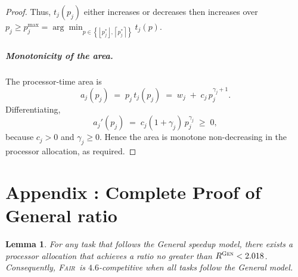 \documentclass{article}
\newtheorem{lemma}{Lemma}
\newcommand\fair{\textsc{Fair}\xspace}
\newcommand\GEN{\textsc{Gen}\xspace}
\begin{document}
\begin{proof}
      Thus, \( t_j(p_j) \) either increases or decreases then increases over \( p_j \geq 
p_j^{\max} = \arg\min_{p \in \left\{\left\lfloor p_j^* \right\rfloor, \left\lceil p_j^* \right\rceil\right\}} t_j(p)
\).

\subparagraph*{Monotonicity of the area.}
The processor-time area is
\[
a_j(p_j)\;=\;p_j\,t_j(p_j)
            \;=\;w_j\;+\;c_j\,p_j^{\gamma_j+1}.
\]
Differentiating,
\[
a_j'(p_j)
    \;=\;c_j(1+\gamma_j)\,p_j^{\gamma_j}\;\ge\;0,
\]
because \(c_j>0\) and \(\gamma_j\ge 0\).
Hence the area is monotone non-decreasing in the processor allocation, as required.

\end{proof}



\section{Appendix : Complete Proof of General ratio}
\label{ap.general}


\begin{lemma}
For any task that follows the General speedup model, there exists a processor allocation that achieves a ratio no greater than $R^{\GEN}<2.018$. Consequently, \fair\ is $4.6$-competitive when all tasks follow the General model.
\end{lemma}
\end{document}
